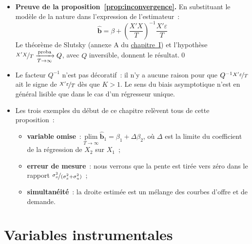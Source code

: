 \documentclass[10pt,a4paper]{article}
\newcommand{\siteurl}{https://le-mans.adjemian.eu/econometrics}
\newcommand{\chapref}[2]{\href{\siteurl/chapitre-#1.pdf}{chapitre~#2}}
\newcommand{\plim}{\xrightarrow[T\rightarrow\infty]{\text{proba}}}
\theoremstyle{definition}
\renewcommand{\newline}{\unskip\par\vspace{1.5pt}}
\begin{document}
\begin{notes}

  \begin{itemize}

  \item \textbf{Preuve de la proposition~\ref{prop:inconvergence}.} En
    substituant le modèle de la nature dans l'expression de l'estimateur~:
    \[
      \hat{\mathbf b} = \beta + \left( \frac{X'X}{T} \right)^{-1}\frac{X'\varepsilon}{T}
    \]
    Le théorème de Slutsky (annexe A du \chapref{1}{I}) et l'hypothèse $\nicefrac{X'X}{T}\plim Q$, avec $Q$ inversible,
    donnent le résultat.\qed\newline

  \item[\dbend] Le facteur $Q^{-1}$ n'est pas décoratif~: il n'y a aucune raison
    pour que $Q^{-1}\nicefrac{X'\varepsilon}{T}$ ait le signe de
    $\nicefrac{X'\varepsilon}{T}$ dès que $K>1$. Le sens du biais asymptotique
    n'est en général lisible que dans le cas d'un régresseur unique.\newline

  \item Les trois exemples du début de ce chapitre relèvent tous de cette
    proposition~:
    \begin{itemize}
    \item \textbf{variable omise}~: $\underset{T\rightarrow\infty}{\text{plim}}\,\hat{\mathbf b}_1 = \beta_1 + \Delta\beta_2$,
      où $\Delta$ est la limite du coefficient de la régression de $X_2$
      sur $X_1$~;
    \item \textbf{erreur de mesure}~: nous verrons que la pente est tirée vers
      zéro dans le rapport $\nicefrac{\sigma_x^2}{(\sigma_x^2+\sigma_u^2)}$~;
    \item \textbf{simultanéité}~: la droite estimée est un mélange des courbes
      d'offre et de demande.
    \end{itemize}

  \end{itemize}

\end{notes}


\section{Variables instrumentales}
\end{document}
